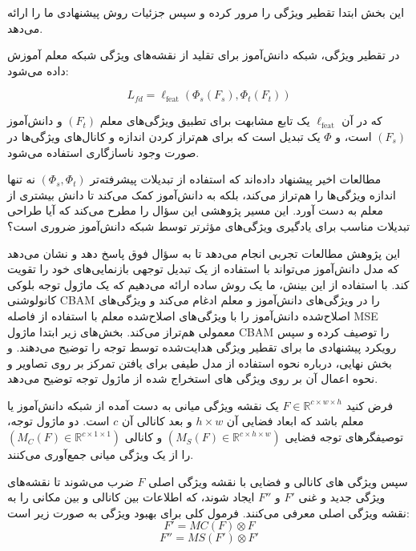

این بخش ابتدا تقطیر ویژگی را مرور کرده و سپس جزئیات روش پیشنهادی ما را ارائه می‌دهد.


در تقطیر ویژگی، شبکه دانش‌آموز برای تقلید از نقشه‌های ویژگی شبکه معلم آموزش داده می‌شود:

\begin{equation}
L_{fd} = \ell_{\text{feat}}(\Phi_s(F_s), \Phi_t(F_t))
\end{equation}

که در آن $\ell_{\text{feat}}$ یک تابع مشابهت برای تطبیق ویژگی‌های معلم $(F_t)$ و دانش‌آموز $(F_s)$ است، و $\Phi$ یک تبدیل است که برای هم‌تراز کردن اندازه و کانال‌های ویژگی‌ها در صورت وجود ناسازگاری استفاده می‌شود.

مطالعات اخیر پیشنهاد داده‌اند که استفاده از تبدیلات پیشرفته‌تر $(\Phi_s, \Phi_t)$ نه تنها اندازه ویژگی‌ها را هم‌تراز می‌کند، بلکه به دانش‌آموز کمک می‌کند تا دانش بیشتری از معلم به دست آورد. این مسیر پژوهشی این سؤال را مطرح می‌کند که آیا طراحی تبدیلات مناسب برای یادگیری ویژگی‌های مؤثرتر توسط شبکه دانش‌آموز ضروری است؟

این پژوهش مطالعات تجربی انجام می‌دهد تا به سؤال فوق پاسخ دهد و نشان می‌دهد که مدل دانش‌آموز می‌تواند با استفاده از یک تبدیل توجهی بازنمایی‌های خود را تقویت کند. با استفاده از این بینش، ما یک روش ساده ارائه می‌دهیم که یک ماژول توجه بلوکی کانولوشنی CBAM را در ویژگی‌های دانش‌آموز و معلم ادغام می‌کند و ویژگی‌های اصلاح‌شده دانش‌آموز را با ویژگی‌های اصلاح‌شده معلم با استفاده از فاصله MSE معمولی هم‌تراز می‌کند. بخش‌های زیر ابتدا ماژول CBAM را توصیف کرده و سپس رویکرد پیشنهادی ما برای تقطیر ویژگی هدایت‌شده توسط توجه را توضیح می‌دهند. و بخش نهایی، درباره نحوه استفاده از مدل طیفی برای یافتن تمرکز بر روی تصاویر و نحوه اعمال آن بر روی ویژگی های استخراج شده از ماژول توجه توضیح می‌دهد.


فرض کنید $F \in \mathbb{R}^{c \times w \times h}$ یک نقشه ویژگی میانی به دست آمده از شبکه دانش‌آموز یا معلم باشد که ابعاد فضایی آن $h \times w$ و بعد کانالی آن $c$ است. دو ماژول توجه، توصیفگرهای توجه فضایی $(M_S(F) \in \mathbb{R}^{c \times h \times w})$ و کانالی $(M_C(F) \in \mathbb{R}^{c \times 1 \times 1})$ را از یک ویژگی میانی جمع‌آوری می‌کنند.


سپس ویژگی های کانالی و فضایی با نقشه ویژگی اصلی $F$ ضرب می‌شوند تا نقشه‌های ویژگی جدید و غنی $F'$ و $F''$ ایجاد شوند، که اطلاعات بین کانالی و بین مکانی را به نقشه ویژگی اصلی معرفی می‌کنند. فرمول کلی برای بهبود ویژگی به صورت زیر است:
\begin{equation}
F' = MC(F) \otimes F
\end{equation}
\begin{equation}
F'' = MS(F') \otimes F'
\end{equation}

